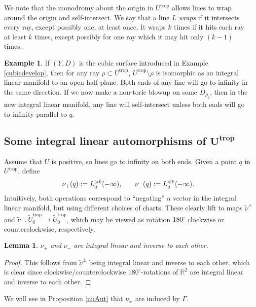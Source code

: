 \documentclass[pdftex]{sigma}
\numberwithin{equation}{section}
\numberwithin{figure}{section}
\numberwithin{table}{section}
\DeclareMathOperator{\trop}{trop}
\let\bb=\mathbb
\let\rar=\rightarrow
\let\wt=\widetilde
\newtheorem{lem}[thm]{Lemma}
\theoremstyle{definition}
\newtheorem{eg}[thm]{Example}
\begin{document}
We note that the monodromy about the origin in $U^{\trop}$ allows lines to wrap around the origin and self-intersect. We say that a line $L$ {\it wraps} if it intersects every ray, except possibly one, at least once. It wraps $k$ times if it hits each ray at least $k$ times, except possibly for one ray which it may hit only $(k-1)$ times.

\begin{eg} If $(Y,D)$ is the cubic surface introduced in Example \ref{cubicdevelop}, then for any ray $\rho \subset {U^{\trop}}$, $U^{\trop}\setminus \rho$ is isomorphic as an integral linear manifold to an open half-plane. Both ends of any line will go to infinity in the same direction. If we now make a non-toric blowup on some $D_{\rho_q}$, then in the new integral linear manifold, any line will self-intersect unless both ends will go to infinity parallel to $q$.
\end{eg}

\subsection[Some integral linear automorphisms of $U^{\trop}$]{Some integral linear automorphisms of $\boldsymbol{U^{\trop}}$}\label{LinearAuts}

Assume that $U$ is positive, so lines go to infinity on both ends. Given a point $q$ in $U^{\trop}$, define
\begin{gather*}
	\nu_+(q):=L_q^{>0}(-\infty), \hspace{.25 in} \nu_-(q):=L_q^{<0}(-\infty).
\end{gather*}
Intuitively, both operations correspond to ``negating'' a vector in the integral linear manifold, but using different choices of charts. These clearly lift to maps $\wt{\nu}^+$ and $\wt{\nu}^-\colon \wt{U}_0^{\trop}\rar \wt{U}_0^{\trop}$, which may be viewed as rotation $180^{\circ}$ clockwise or counterclockwise, respectively.

\begin{lem}\label{nu}$\nu_+$ and $\nu_-$ are integral linear and inverse to each other.
\end{lem}
\begin{proof}
This follows from $\wt{\nu}^{\pm}$ being integral linear and inverse to each other, which is clear since clockwise/counterclockwise $180^{\circ}$-rotations of $\bb{R}^2$ are integral linear and inverse to each other.
\end{proof}

We will see in Proposition \ref{nuAut} that $\nu_{\pm}$ are induced by $\Gamma$.
\end{document}

